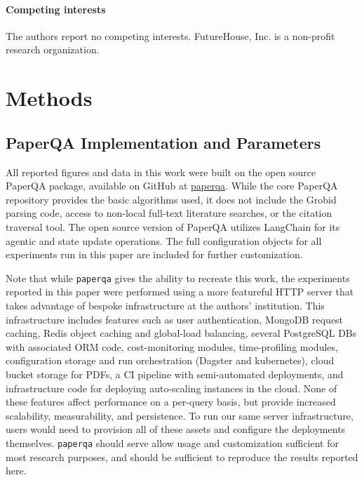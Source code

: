 \documentclass{article}
\begin{document}
\begin{bibunit}[unsrt]
\paragraph{Competing interests} The authors report no competing interests. FutureHouse, Inc. is a non-profit research organization. 

\putbib[references] %

\end{bibunit}


\renewcommand{\thesuppfigure}{S\arabic{suppfigure}}
\setcounter{suppfigure}{0}

\section{Methods}

\subsection{PaperQA Implementation and Parameters}

All reported figures and data in this work were built on the open source PaperQA package, available on GitHub at \href{https://github.com/Future-House/paper-qa}{paperqa}. While the core PaperQA repository provides the basic algorithms used, it does not include the Grobid parsing code, access to non-local full-text literature searches, or the citation traversal tool. The open source version of PaperQA utilizes LangChain \cite{LANGCHAIN} for its agentic and state update operations. The full configuration objects for all experiments run in this paper are included for further customization.

Note that while \texttt{paperqa} gives the ability to recreate this work, the experiments reported in this paper were performed using a more featureful HTTP server that takes advantage of bespoke infrastructure at the authors' institution. This infrastructure includes features such as user authentication, MongoDB request caching, Redis object caching and global-load balancing, several PostgreSQL DBs with associated ORM code, cost-monitoring modules, time-profiling modules, configuration storage and run orchestration (Dagster\cite{dagster} and kubernetes\cite{kubernetes}), cloud bucket storage for PDFs, a CI pipeline with semi-automated deployments, and infrastructure code for deploying auto-scaling instances in the cloud. None of these features affect performance on a per-query basis, but provide increased scalability, measurability, and persistence. To run our same server infrastructure, users would need to provision all of these assets and configure the deployments themselves. \texttt{paperqa} should serve allow usage and customization sufficient for most research purposes, and should be sufficient to reproduce the results reported here.
\end{document}

